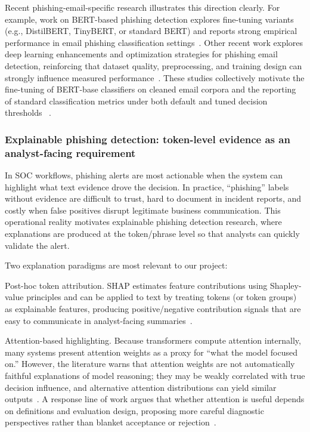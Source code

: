 \documentclass[conference]{IEEEtran}
\begin{document}
Recent phishing-email-specific research illustrates this direction clearly. For example, work on BERT-based phishing detection explores fine-tuning variants (e.g., DistilBERT, TinyBERT, or standard BERT) and reports strong empirical performance in email phishing classification settings~\cite{SKZM2023}. Other recent work explores deep learning enhancements and optimization strategies for phishing email detection, reinforcing that dataset quality, preprocessing, and training design can strongly influence measured performance~\cite{MURSFPTJ2025}. These studies collectively motivate the fine-tuning of BERT-base classifiers on cleaned email corpora and the reporting of standard classification metrics under both default and tuned decision thresholds~\cite{JMKK2019} \cite{phishingDT} \cite{SKZM2023}.

\subsubsection{Explainable phishing detection: token-level evidence as an analyst-facing requirement}

In SOC workflows, phishing alerts are most actionable when the system can highlight what text evidence drove the decision. In practice, “phishing” labels without evidence are difficult to trust, hard to document in incident reports, and costly when false positives disrupt legitimate business communication. This operational reality motivates explainable phishing detection research, where explanations are produced at the token/phrase level so that analysts can quickly validate the alert.

Two explanation paradigms are most relevant to our project:

Post-hoc token attribution. SHAP estimates feature contributions using Shapley-value principles and can be applied to text by treating tokens (or token groups) as explainable features, producing positive/negative contribution signals that are easy to communicate in analyst-facing summaries~\cite{LL2017}.

Attention-based highlighting. Because transformers compute attention internally, many systems present attention weights as a proxy for “what the model focused on.” However, the literature warns that attention weights are not automatically faithful explanations of model reasoning; they may be weakly correlated with true decision influence, and alternative attention distributions can yield similar outputs~\cite{JW2019}. A response line of work argues that whether attention is useful depends on definitions and evaluation design, proposing more careful diagnostic perspectives rather than blanket acceptance or rejection~\cite{SY2019}.
\end{document}
